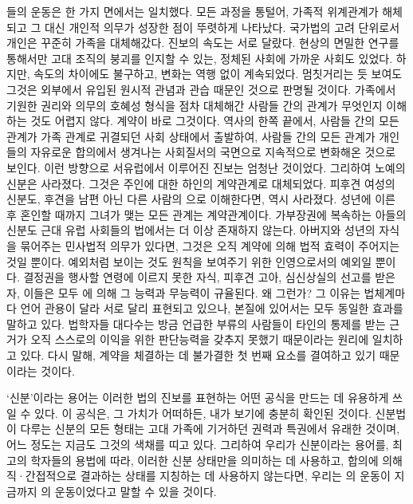 들의 운동은 한 가지 면에서는 일치했다.
모든 과정을 통털어, 가족적 위계관계가 해체되고 그 대신 개인적 의무가
성장한 점이 뚜렷하게 나타났다.
국가법의 고려 단위로서
개인은 꾸준히 가족을 대체해갔다.
진보의 속도는 서로 달랐다.
현상의 면밀한 연구를 통해서만
고대 조직의 붕괴를 인지할 수 있는,
정체된 사회에 가까운 사회도 있었다.
하지만,
속도의 차이에도 불구하고,
변화는 역행 없이 계속되었다.
멈칫거리는 듯 보여도 그것은 외부에서 유입된 원시적 관념과 관습 때문인 것으로
판명될 것이다.
가족에서 기원한 권리와 의무의 호혜성 형식을 점차 대체해간
사람들 간의 관계가 무엇인지 이해하는 것도 어렵지 않다.
계약이 바로 그것이다.
역사의 한쪽 끝에서,
사람들 간의 모든 관계가 가족 관계로 귀결되던 사회 상태에서 출발하여,
사람들 간의 모든 관계가 개인들의 자유로운 합의에서 생겨나는
사회질서의 국면으로
지속적으로 변화해온 것으로 보인다.
이런 방향으로
서유럽에서
이루어진 진보는 엄청난 것이었다.
그리하여 노예의 신분은 사라졌다.
그것은 주인에 대한 하인의 계약관계로 대체되었다.
피후견 여성의 신분도,
후견을 남편 아닌 다른 사람의 으로 이해한다면,
역시 사라졌다.
성년에 이른 후 혼인할 때까지 그녀가 맺는 모든 관계는 계약관계이다.
가부장권에 복속하는 아들의 신분도 근대 유럽 사회들의 법에서는
더 이상 존재하지 않는다.
아버지와 성년의 자식을 묶어주는 민사법적 의무가 있다면,
그것은 오직 계약에 의해 법적 효력이 주어지는 것일 뿐이다.
예외처럼 보이는 것도 원칙을 보여주기 위한
인영으로서의 예외일 뿐이다.
결정권을 행사할 연령에 이르지 못한 자식,
피후견 고아, 심신상실의 선고를 받은 자,
이들은 모두 에 의해
그 능력과 무능력이 규율된다.
왜 그런가?
그 이유는 법체계마다 언어 관용이 달라 서로 달리 표현되고 있으나,
본질에 있어서는 모두 동일한 효과를 말하고 있다.
법학자들 대다수는
방금 언급한 부류의 사람들이
타인의 통제를 받는 근거가
오직
스스로의 이익을 위한 판단능력을 갖추지 못했기 때문이라는 원리에
일치하고 있다.
다시 말해, 계약을 체결하는 데 불가결한
첫 번째 요소를 결여하고 있기 때문이라는 것이다.

`신분'이라는 용어는
이러한 법의 진보를 표현하는 어떤 공식을 만드는 데
유용하게 쓰일 수 있다.
이 공식은, 그 가치가 어떠하든,
내가 보기에 충분히 확인된 것이다.
신분법이 다루는 신분의 모든 형태는
고대 가족에 기거하던 권력과 특권에서 유래한 것이며,
어느 정도는 지금도 그것의 색채를 띠고 있다.
그리하여 우리가 신분이라는 용어를,
최고의 학자들의 용법에 따라,
이러한 신분 상태만을 의미하는 데 사용하고,
합의에 의해 직^^b7간접적으로 결과하는 상태를
지칭하는 데 사용하지 않는다면,
우리는 의 운동이 지금까지
의 운동이었다고
말할 수 있을 것이다.

